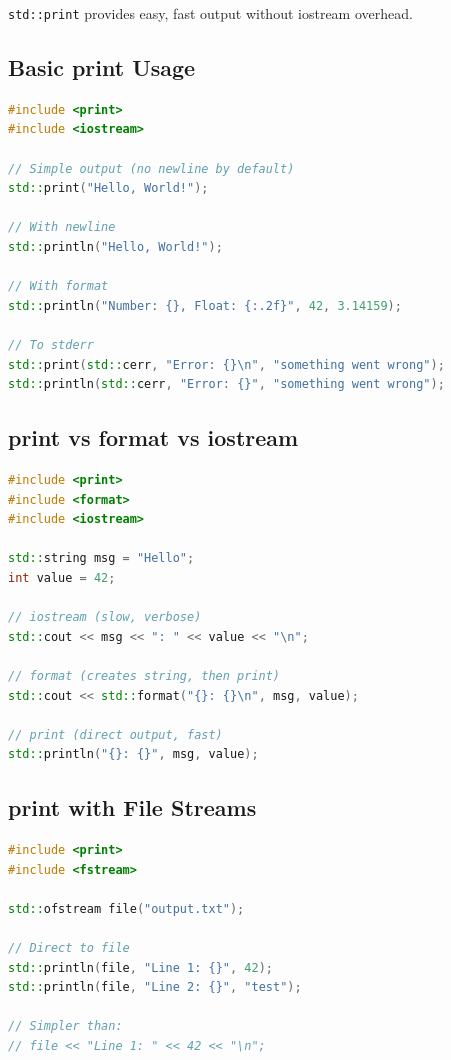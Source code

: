 \passthrough{\lstinline!std::print!} provides easy, fast output without
iostream overhead.

\hypertarget{basic-print-usage}{%
\subsection{Basic print Usage}\label{basic-print-usage}}

\begin{lstlisting}[language={C++}]
#include <print>
#include <iostream>

// Simple output (no newline by default)
std::print("Hello, World!");

// With newline
std::println("Hello, World!");

// With format
std::println("Number: {}, Float: {:.2f}", 42, 3.14159);

// To stderr
std::print(std::cerr, "Error: {}\n", "something went wrong");
std::println(std::cerr, "Error: {}", "something went wrong");
\end{lstlisting}

\hypertarget{print-vs-format-vs-iostream}{%
\subsection{print vs format vs
iostream}\label{print-vs-format-vs-iostream}}

\begin{lstlisting}[language={C++}]
#include <print>
#include <format>
#include <iostream>

std::string msg = "Hello";
int value = 42;

// iostream (slow, verbose)
std::cout << msg << ": " << value << "\n";

// format (creates string, then print)
std::cout << std::format("{}: {}\n", msg, value);

// print (direct output, fast)
std::println("{}: {}", msg, value);
\end{lstlisting}

\hypertarget{print-with-file-streams}{%
\subsection{print with File Streams}\label{print-with-file-streams}}

\begin{lstlisting}[language={C++}]
#include <print>
#include <fstream>

std::ofstream file("output.txt");

// Direct to file
std::println(file, "Line 1: {}", 42);
std::println(file, "Line 2: {}", "test");

// Simpler than:
// file << "Line 1: " << 42 << "\n";
\end{lstlisting}

